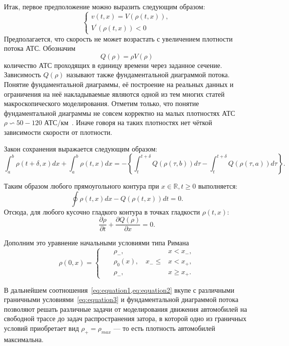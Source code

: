 Итак, первое предположение можно выразить следующим образом:
\begin{equation}
    \label{eq:equation1}
    \left\{
    \begin{array}{rl}
        v(t, x) = V(\rho(t, x)),\\
        V^{'}(\rho(t, x)) < 0
    \end{array}
    \right.
\end{equation}
Предполагается, что скорость не может возрастать с увеличением плотности потока АТС.
Обозначим
\[
    Q(\rho) = \rho V(\rho)
\]
количество АТС проходящих в единицу времени через заданное сечение.
Зависимость \( Q(\rho) \) называют также фундаментальной диаграммой потока.
Понятие фундаментальной диаграммы, её построение на реальных данных и ограничения на неё накладываемые являются одной из тем многих статей макроскопического моделирования.
Отметим только, что понятие фундаментальной диаграммы не совсем корректно на малых плотностях АТС \( \rho \backsim 50-120 \) АТС/км~\cite{kerner2009introduction}.
Иначе говоря на таких плотностях нет чёткой зависимости скорости от плотности.

Закон сохранения выражается следующим образом:
\[
    \int_{a}^{b} \rho(t + \delta, x)dx + \int_{a}^{b} \rho(t, x)dx = -\left\{\int_{t}^{t + \delta} Q(\rho(\tau, b))d\tau - \int_{t}^{t + \delta} Q(\rho(\tau, a))d\tau \right\}.
\]

Таким образом любого прямоугольного контура при $x\in \mathbb{R}, t\geq 0$ выполняется:
\[
    \oint \rho(t, x)dx - Q(\rho(t, x))dt = 0.
\]
Отсюда, для любого кусочно гладкого контура в точках гладкости \( \rho(t, x) \):
\begin{equation}
    \label{eq:equation2}
    \frac{\partial \rho}{\partial t} + \frac{\partial Q(\rho)}{\partial x} = 0.
\end{equation}

Дополним это уравнение начальными условиями типа Римана
\begin{equation}
    \label{eq:equation3}
    \rho(0, x) =
    \left\{
    \begin{alignedat}{3}
        &&\rho_{-},\quad &x<x_{-},  \\
        &&\rho_{0}(x),\quad x_{-}\leq &x<x_{+},  \\
        &&\rho_{-},\quad &x\geq x_{+}.
    \end{alignedat}
    \right.
\end{equation}

В дальнейшем соотношения~\cref{eq:equation1,eq:equation2} вкупе с различными граничными условиями~\cref{eq:equation3} и фундаментальной диаграммой потока позволяют решать различные задачи от моделирования движения автомобилей на свободной трассе до задач распространения затора, в которой одно из граничных условий приобретает вид \(\rho_{+} = \rho_{max}\) --- то есть плотность автомобилей максимальна.


